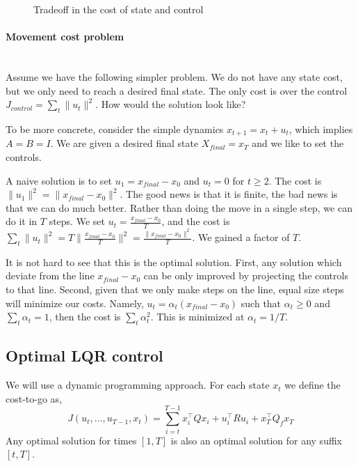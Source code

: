  \begin{figure}
   \begin{centering}
   \caption{Tradeoff in the cost of state and control}\label{fig:L12-cost-tradeoff}
  \end{centering}
 \end{figure}


\paragraph{Movement cost problem}\ \\

Assume we have the following simpler problem. We do not have any
state cost, but we only need to reach a desired final state. The
only cost is over the control $J_{control}=\sum_t \|u_t\|^2$. How
would the solution look like?

To be more concrete, consider the simple dynamics $x_{t+1}=x_t+u_t$,
which implies $A=B=I$. We are given a desired final state
$X_{final}=x_T$ and we like to set the controls.

A naive solution is to set $u_1=x_{final}-x_0$ and $u_t=0$ for
$t\geq 2$. The cost is $\|u_1\|^2=\|x_{final}-x_0\|^2$. The good
news is that it is finite, the bad news is that we can do much
better. Rather than doing the move in a single step, we can do it in
$T$ steps. We set $u_t= \frac{x_{final}-x_0}{T}$, and the cost is
$\sum_t \|u_t\|^2=T\|\frac{x_{final}-x_0}{T}\|^2=
\frac{\|x_{final}-x_0\|^2}{T}$. We gained a factor of $T$.

It is not hard to see that this is the optimal solution. First, any
solution which deviate from the line $x_{final}-x_0$ can be only
improved by projecting the controls to that line. Second, given that
we only make steps on the line, equal size steps will minimize our
costs. Namely, $u_t = \alpha_t (x_{final}-x_0)$ such that
$\alpha_t\geq 0$ and $\sum_t\alpha_t=1$, then the cost is $\sum_t
\alpha_t^2$. This is minimized at $\alpha_t=1/T$.

\subsection{Optimal LQR control}

We will use a dynamic programming approach. For each state $x_t$ we
define the cost-to-go as,
\[
J(u_t, \ldots, u_{T-1},x_t)=\sum_{i=t}^{T-1}x_i^\top Qx_i+u_i^\top R
u_i+ x_T^\top Q_f x_T
\]
Any optimal solution for times $[1,T]$ is also an optimal solution
for any suffix $[t,T]$.

